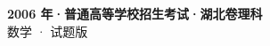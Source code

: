 \documentclass[zihao=-4, a4paper]{ctexart}
\begin{document}
\begin{center}
  {\Large\bfseries 2006 年·普通高等学校招生考试·湖北卷理科}\\[4pt]
  {\large 数学 · 试题版}
\end{center}
\medskip
{}

\end{document}
